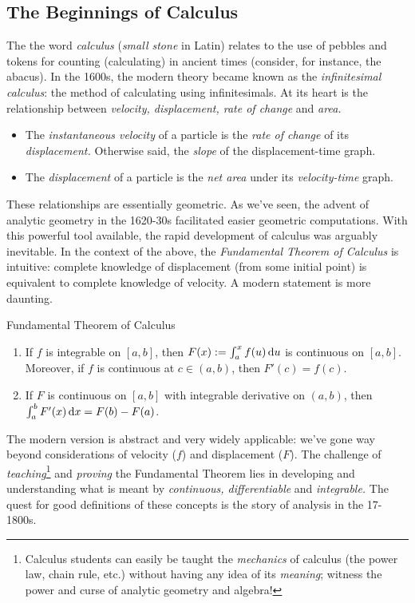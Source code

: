 \clearpage



\subsection{The Beginnings of Calculus}\label{sec:calc1}

The the word \emph{calculus} (\emph{small stone} in Latin) relates to the use of pebbles and tokens for counting (calculating) in ancient times (consider, for instance, the abacus). In the 1600s, the modern theory became known as the \emph{infinitesimal calculus}: the method of calculating using infinitesimals. At its heart is the relationship between \emph{velocity, displacement, rate of change} and \emph{area.}
\begin{itemize}
  \item The \emph{instantaneous velocity} of a particle is the \emph{rate of change} of its \emph{displacement.} Otherwise said, the \emph{slope} of the displacement-time graph. 
  \item The \emph{displacement} of a particle is the \emph{net area} under its \emph{velocity-time} graph.
\end{itemize}
These relationships are essentially geometric. As we've seen, the advent of analytic geometry in the 1620-30s facilitated easier geometric computations. With this powerful tool available, the rapid development of calculus was arguably inevitable.
\smallbreak
In the context of the above, the \emph{Fundamental Theorem of Calculus} is intuitive: complete knowledge of displacement (from some initial point) is equivalent to complete knowledge of velocity. A modern statement is more daunting.

\begin{thm*}{Fundamental Theorem of Calculus}{}
	\begin{enumerate}
	  \item If $f$ is integrable on $[a,b]$, then $F(x):=\int_a^xf(u)\,{\mathrm{d} u}$ is continuous on $[a,b]$. Moreover, if $f$ is continuous at $c\in(a,b)$, then $F'(c)=f(c)$.
	  \item If $F$ is continuous on $[a,b]$ with integrable derivative on $(a,b)$, then $\int_a^bF'(x)\,{\mathrm{d} x}=F(b)-F(a)$.
	\end{enumerate}
\end{thm*}

The modern version is abstract and very widely applicable: we've gone way beyond considerations of velocity ($f$) and displacement ($F$). The challenge of \emph{teaching}\footnote{%
	Calculus students can easily be taught the \emph{mechanics} of calculus (the power law, chain rule, etc.) without having any idea of its \emph{meaning}; witness the power and curse of analytic geometry and algebra!%
}
and \emph{proving} the Fundamental Theorem lies in developing and understanding what is meant by \emph{continuous, differentiable} and \emph{integrable.} The quest for good definitions of these concepts is the story of analysis in the 17-1800s.
\medbreak

